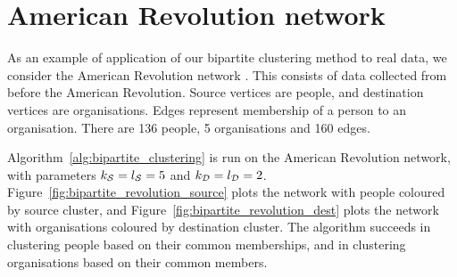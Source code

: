 \section{American Revolution network} \label{sec:bipartite_american_revolution}

As an example of application of our bipartite clustering method to real data, we consider the American Revolution network \cite{konect:brunson_revolution}. This consists of data collected from before the American Revolution. Source vertices are people, and destination vertices are organisations. Edges represent membership of a person to an organisation. There are 136 people, 5 organisations and 160 edges.

Algorithm~\ref{alg:bipartite_clustering} is run on the American Revolution network, with parameters $k_{\mathcal{S}} = l_{\mathcal{S}} = 5$ and $k_{\mathcal{D}} = l_{\mathcal{D}} = 2$. Figure~\ref{fig:bipartite_revolution_source} plots the network with people coloured by source cluster, and Figure~\ref{fig:bipartite_revolution_dest} plots the network with organisations coloured by destination cluster. The algorithm succeeds in clustering people based on their common memberships, and in clustering organisations based on their common members.




